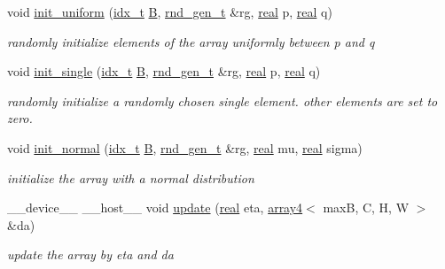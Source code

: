 \begin{DoxyCompactItemize}
void \hyperlink{structarray4_ab4374d21733665dbda4acaf2aeccb1df}{init\+\_\+uniform} (\hyperlink{vgg__util_8h_a8e93478a00e685bea5e6a3f617bf03a3}{idx\+\_\+t} \hyperlink{structarray4_a68aee457ea4034e17475b6ec5c497c12}{B}, \hyperlink{structrnd__gen__t}{rnd\+\_\+gen\+\_\+t} \&rg, \hyperlink{vgg__util_8h_a1082d08aaa761215ec83e7149f27ad16}{real} p, \hyperlink{vgg__util_8h_a1082d08aaa761215ec83e7149f27ad16}{real} q)
\begin{DoxyCompactList}\small\item\em randomly initialize elements of the array uniformly between p and q \end{DoxyCompactList}\item 
void \hyperlink{structarray4_ac514884f2f5012d0ab244fc57215df4c}{init\+\_\+single} (\hyperlink{vgg__util_8h_a8e93478a00e685bea5e6a3f617bf03a3}{idx\+\_\+t} \hyperlink{structarray4_a68aee457ea4034e17475b6ec5c497c12}{B}, \hyperlink{structrnd__gen__t}{rnd\+\_\+gen\+\_\+t} \&rg, \hyperlink{vgg__util_8h_a1082d08aaa761215ec83e7149f27ad16}{real} p, \hyperlink{vgg__util_8h_a1082d08aaa761215ec83e7149f27ad16}{real} q)
\begin{DoxyCompactList}\small\item\em randomly initialize a randomly chosen single element. other elements are set to zero. \end{DoxyCompactList}\item 
void \hyperlink{structarray4_a6bc347ffd284538e10e8d06a328cf6c4}{init\+\_\+normal} (\hyperlink{vgg__util_8h_a8e93478a00e685bea5e6a3f617bf03a3}{idx\+\_\+t} \hyperlink{structarray4_a68aee457ea4034e17475b6ec5c497c12}{B}, \hyperlink{structrnd__gen__t}{rnd\+\_\+gen\+\_\+t} \&rg, \hyperlink{vgg__util_8h_a1082d08aaa761215ec83e7149f27ad16}{real} mu, \hyperlink{vgg__util_8h_a1082d08aaa761215ec83e7149f27ad16}{real} sigma)
\begin{DoxyCompactList}\small\item\em initialize the array with a normal distribution \end{DoxyCompactList}\item 
\+\_\+\+\_\+device\+\_\+\+\_\+ \+\_\+\+\_\+host\+\_\+\+\_\+ void \hyperlink{structarray4_aec956ca804fd9176479805bd753b4b1a}{update} (\hyperlink{vgg__util_8h_a1082d08aaa761215ec83e7149f27ad16}{real} eta, \hyperlink{structarray4}{array4}$<$ maxB, C, H, W $>$ \&da)
\begin{DoxyCompactList}\small\item\em update the array by eta and da \end{DoxyCompactList}\item 

\end{DoxyCompactItemize}
